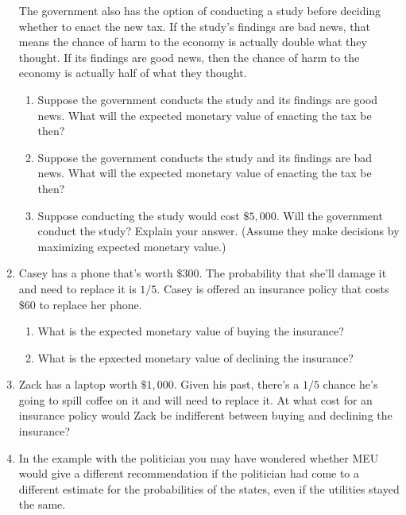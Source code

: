 \documentclass[]{tufte-book}
\providecommand{\tightlist}{%
  \setlength{\itemsep}{0pt}\setlength{\parskip}{0pt}}
\begin{document}
\begin{enumerate}
  The government also has the option of conducting a study before deciding whether to enact the new tax. If the study's findings are bad news, that means the chance of harm to the economy is actually double what they thought. If its findings are good news, then the chance of harm to the economy is actually half of what they thought.

  \begin{enumerate}
  \def\labelenumii{\alph{enumii}.}
  \setcounter{enumii}{1}
  \tightlist
  \item
    Suppose the government conducts the study and its findings are good news. What will the expected monetary value of enacting the tax be then?
  \item
    Suppose the government conducts the study and its findings are bad news. What will the expected monetary value of enacting the tax be then?
  \item
    Suppose conducting the study would cost \(\$5,000\). Will the government conduct the study? Explain your answer. (Assume they make decisions by maximizing expected monetary value.)
  \end{enumerate}
\item
  Casey has a phone that's worth \(\$300\). The probability that she'll damage it and need to replace it is \(1/5\). Casey is offered an insurance policy that costs \(\$60\) to replace her phone.

  \begin{enumerate}
  \def\labelenumii{\alph{enumii}.}
  \tightlist
  \item
    What is the expected monetary value of buying the insurance?
  \item
    What is the epxected monetary value of declining the insurance?
  \end{enumerate}
\item
  Zack has a laptop worth \(\$1,000\). Given his past, there's a \(1/5\) chance he's going to spill coffee on it and will need to replace it. At what cost for an insurance policy would Zack be indifferent between buying and declining the insurance?
\item
  In the example with the politician you may have wondered whether MEU would give a different recommendation if the politician had come to a different estimate for the probabilities of the states, even if the utilities stayed the same.


\end{enumerate}
\end{document}
